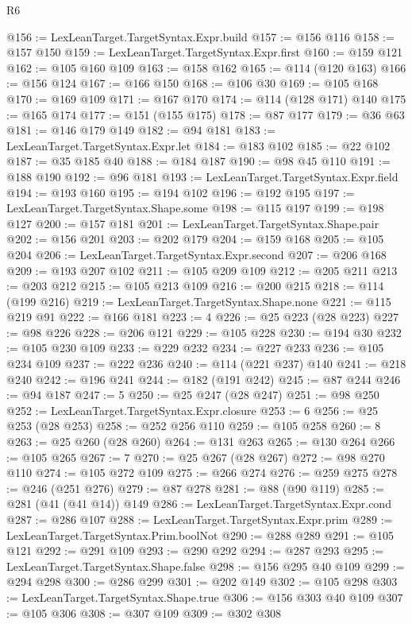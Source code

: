 \begin{lexlean}{R6}
\begin{coremodule}
@156 := LexLeanTarget.TargetSyntax.Expr.build
@157 := @156 @116
@158 := @157 @150
@159 := LexLeanTarget.TargetSyntax.Expr.first
@160 := @159 @121
@162 := @105 @160 @109
@163 := @158 @162
@165 := @114 (@120 @163)
@166 := @156 @124
@167 := @166 @150
@168 := @106 @30
@169 := @105 @168
@170 := @169 @109
@171 := @167 @170
@174 := @114 (@128 @171) @140
@175 := @165 @174
@177 := @151 (@155 @175)
@178 := @87 @177
@179 := @36 @63
@181 := @146 @179 @149
@182 := @94 @181
@183 := LexLeanTarget.TargetSyntax.Expr.let
@184 := @183 @102
@185 := @22 @102
@187 := @35 @185 @40
@188 := @184 @187
@190 := @98 @45 @110
@191 := @188 @190
@192 := @96 @181
@193 := LexLeanTarget.TargetSyntax.Expr.field
@194 := @193 @160
@195 := @194 @102
@196 := @192 @195
@197 := LexLeanTarget.TargetSyntax.Shape.some
@198 := @115 @197
@199 := @198 @127
@200 := @157 @181
@201 := LexLeanTarget.TargetSyntax.Shape.pair
@202 := @156 @201
@203 := @202 @179
@204 := @159 @168
@205 := @105 @204
@206 := LexLeanTarget.TargetSyntax.Expr.second
@207 := @206 @168
@209 := @193 @207 @102
@211 := @105 @209 @109
@212 := @205 @211
@213 := @203 @212
@215 := @105 @213 @109
@216 := @200 @215
@218 := @114 (@199 @216)
@219 := LexLeanTarget.TargetSyntax.Shape.none
@221 := @115 @219 @91
@222 := @166 @181
@223 := 4
@226 := @25 @223 (@28 @223)
@227 := @98 @226
@228 := @206 @121
@229 := @105 @228
@230 := @194 @30
@232 := @105 @230 @109
@233 := @229 @232
@234 := @227 @233
@236 := @105 @234 @109
@237 := @222 @236
@240 := @114 (@221 @237) @140
@241 := @218 @240
@242 := @196 @241
@244 := @182 (@191 @242)
@245 := @87 @244
@246 := @94 @187
@247 := 5
@250 := @25 @247 (@28 @247)
@251 := @98 @250
@252 := LexLeanTarget.TargetSyntax.Expr.closure
@253 := 6
@256 := @25 @253 (@28 @253)
@258 := @252 @256 @110
@259 := @105 @258
@260 := 8
@263 := @25 @260 (@28 @260)
@264 := @131 @263
@265 := @130 @264
@266 := @105 @265
@267 := 7
@270 := @25 @267 (@28 @267)
@272 := @98 @270 @110
@274 := @105 @272 @109
@275 := @266 @274
@276 := @259 @275
@278 := @246 (@251 @276)
@279 := @87 @278
@281 := @88 (@90 @119)
@285 := @281 (@41 (@41 @14)) @149
@286 := LexLeanTarget.TargetSyntax.Expr.cond
@287 := @286 @107
@288 := LexLeanTarget.TargetSyntax.Expr.prim
@289 := LexLeanTarget.TargetSyntax.Prim.boolNot
@290 := @288 @289
@291 := @105 @121
@292 := @291 @109
@293 := @290 @292
@294 := @287 @293
@295 := LexLeanTarget.TargetSyntax.Shape.false
@298 := @156 @295 @40 @109
@299 := @294 @298
@300 := @286 @299
@301 := @202 @149
@302 := @105 @298
@303 := LexLeanTarget.TargetSyntax.Shape.true
@306 := @156 @303 @40 @109
@307 := @105 @306
@308 := @307 @109
@309 := @302 @308

\end{coremodule}
\end{lexlean}
